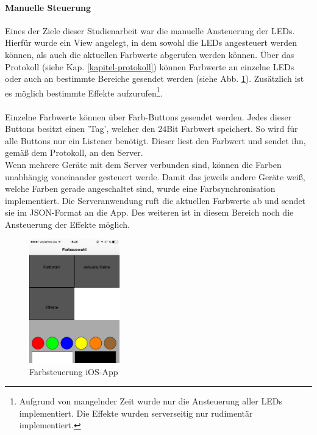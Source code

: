 \paragraph{Manuelle Steuerung} Eines der Ziele dieser Studienarbeit war die manuelle Ansteuerung der LEDs. Hierfür wurde ein View angelegt, in dem sowohl die LEDs angesteuert werden können, als auch die aktuellen Farbwerte abgerufen werden können. Über das Protokoll (siehe Kap. \ref{kapitel-protokoll}) können Farbwerte an einzelne LEDs oder auch an bestimmte Bereiche gesendet werden (siehe Abb. \ref{fig:image-colour}). Zusätzlich ist es möglich bestimmte Effekte aufzurufen\footnote{Aufgrund von mangelnder Zeit wurde nur die Ansteuerung aller LEDs implementiert. Die Effekte wurden serverseitig nur rudimentär implementiert.}. \\\\
Einzelne Farbwerte können über Farb-Buttons gesendet werden. Jedes dieser Buttons besitzt einen 'Tag', welcher den 24Bit Farbwert speichert. So wird für alle Buttons nur ein Listener benötigt. Dieser liest den Farbwert und sendet ihn, gemäß dem Protokoll, an den Server. \\
Wenn mehrere Geräte mit dem Server verbunden sind, können die Farben unabhängig voneinander gesteuert werde. Damit das jeweils andere Geräte weiß, welche Farben gerade angeschaltet sind, wurde eine Farbsynchronisation implementiert. Die Serveranwendung ruft die aktuellen Farbwerte ab und sendet sie im JSON-Format an die App. Des weiteren ist in diesem Bereich noch die Ansteuerung der Effekte möglich.\\
\begin{figure}
	\vspace{-20pt}
	\begin{center}
		\includegraphics[width=0.35\textwidth]{./data/colour.png}
	\end{center}
	\vspace{-20pt}
	\caption{\label{fig:image-colour}Farbsteuerung iOS-App}
	\vspace{-10pt}
\end{figure}
